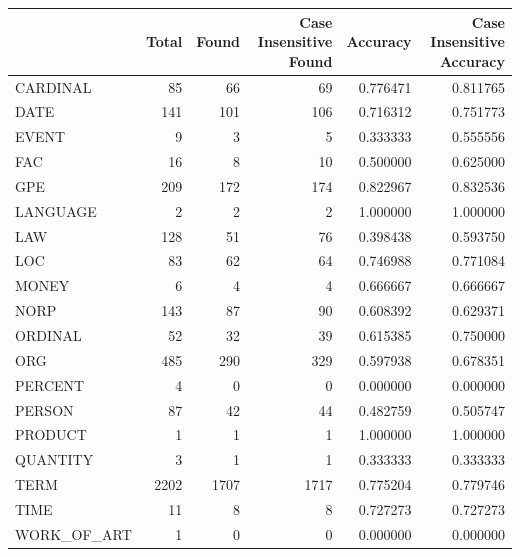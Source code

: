 \begin{tabular}{lrrrrr}
\toprule
 & Total & Found & Case Insensitive Found & Accuracy & Case Insensitive Accuracy \\
\midrule
CARDINAL & 85 & 66 & 69 & 0.776471 & 0.811765 \\
DATE & 141 & 101 & 106 & 0.716312 & 0.751773 \\
EVENT & 9 & 3 & 5 & 0.333333 & 0.555556 \\
FAC & 16 & 8 & 10 & 0.500000 & 0.625000 \\
GPE & 209 & 172 & 174 & 0.822967 & 0.832536 \\
LANGUAGE & 2 & 2 & 2 & 1.000000 & 1.000000 \\
LAW & 128 & 51 & 76 & 0.398438 & 0.593750 \\
LOC & 83 & 62 & 64 & 0.746988 & 0.771084 \\
MONEY & 6 & 4 & 4 & 0.666667 & 0.666667 \\
NORP & 143 & 87 & 90 & 0.608392 & 0.629371 \\
ORDINAL & 52 & 32 & 39 & 0.615385 & 0.750000 \\
ORG & 485 & 290 & 329 & 0.597938 & 0.678351 \\
PERCENT & 4 & 0 & 0 & 0.000000 & 0.000000 \\
PERSON & 87 & 42 & 44 & 0.482759 & 0.505747 \\
PRODUCT & 1 & 1 & 1 & 1.000000 & 1.000000 \\
QUANTITY & 3 & 1 & 1 & 0.333333 & 0.333333 \\
TERM & 2202 & 1707 & 1717 & 0.775204 & 0.779746 \\
TIME & 11 & 8 & 8 & 0.727273 & 0.727273 \\
WORK_OF_ART & 1 & 0 & 0 & 0.000000 & 0.000000 \\
\bottomrule
\end{tabular}
